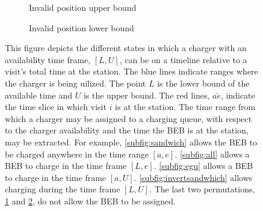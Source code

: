\documentclass[11pt,a4paper,final]{article}
\begin{document}
\begin{figure}
\par\bigskip

\begin{subfigure}{\textwidth}
    \centering
    \caption{Invalid position upper bound}
    \label{subfig:invalid-upper}
\end{subfigure}

\par\bigskip

\begin{subfigure}{\textwidth}
    \centering
    \caption{Invalid position lower bound}
    \label{subfig:invalid-lower}
\end{subfigure}

\caption{This figure depicts the different states in which a charger with an availability time frame, $[L,U]$, can be on a timeline relative to a visit's total time at the station. The blue lines indicate ranges where the charger is being uilized. The point $L$ is the lower bound of the available time and $U$ is the upper bound. The red lines, $\bar{ae}$, indicate the time slice in which visit $i$ is at the station. The time range from which a charger may be assigned to a charging queue, with respect to the charger availability and the time the BEB is at the station, may be extracted. For example, \ref{subfig:sandwich} allows the BEB to be charged anywhere in the time range $[a, e]$. \ref{subfig:all} allows a BEB to charge in the time frame $[L,e]$. \ref{subfig:egu} allows a BEB to charge in the time frame $[a,U]$. \ref{subfig:invertsandwhich} allows charging during the time frame $[L,U]$. The last two permutations, \ref{subfig:invalid-upper} and \ref{subfig:invalid-lower}, do not allow the BEB to be assigned.}
\label{fig:find-free}
\end{figure}
\end{document}
